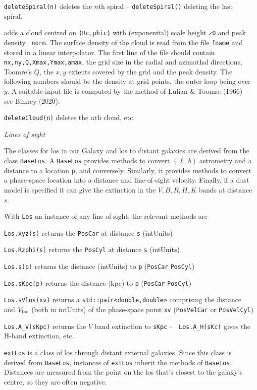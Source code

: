 \nwsec
{\tt deleteSpiral(n)} deletes the $n$th spiral -- {\tt deleteSpiral()}
deleting the last spiral.

 adds a cloud centred on
{\tt(Rc,phic)} with (exponential) scale height {\tt z0} and peak density {\tt
norm}. The surface density of the cloud is read from the file {\tt fname} and
stored in a linear interpolator. The first line of the file should contain
{\tt nx,ny,Q,Xmax,Ymax,amax}, the grid size in the radial and azimuthal
directions, Toomre's $Q$, the $x,y$ extents covered by the grid and the peak
density. The following numbers should be the density at grid points, the
outer loop being over $y$. A suitable input file is computed by the method of
Lulian \& Toomre (1966) -- see Binney (2020). 

\nwsec
{\tt deleteCloud(n)} deletes the $n$th cloud, etc.


\bigskip\centerline{\it Lines of sight}

\nwsec
The classes for los in our Galaxy and los to distant galaxies are derived
from the class {\tt BaseLos}. A {\tt BaseLos} provides methods to convert
$(\ell,b)$ astrometry and a distance to a location {\tt p}, and conversely.
Similarly, it provides methods to convert a phase-space location into a
distance and line-of-sight velocity. Finally, if a dust model is specified it
can give the extinction in the $V,B,R,H,K$ bands at distance $s$.

With {\tt Los} an instance of any line of sight, the relevant methods are


\nwsec
{\tt Los.xyz(s)} returns the {\tt PosCar} at distance {\tt s} (intUnits)

\nwsec
{\tt Los.Rzphi(s)} returns the {\tt PosCyl} at distance {\tt s} (intUnits)

\nwsec
{\tt Los.s(p)} returns the distance (intUnits) to {\tt p} ({\tt PosCar} {\tt PosCyl})

\nwsec
{\tt Los.sKpc(p)} returns the distance (kpc) to {\tt p} ({\tt PosCar} {\tt PosCyl})

\nwsec
{\tt Los.sVlos(xv)} returns a {\tt std::pair<double,double>} comprising the
distance and $V_{\rm los}$ (both in intUnits) of the phase-space point {\tt xv} ({\tt PosVelCar} or
{\tt PosVelCyl}) 

\nwsec
{\tt Los.A\_V(sKpc)} returns the $V$ band extinction to {\tt sKpc} -- {\tt
Los.A\_H(sKc)} gives the H-band extinction, etc.

\nwsec
{\tt extLos} is a class of los through distant external galaxies. Since this
class is derived from {\tt BaseLos}, instances
of {\tt extLos} inherit the methods of {\tt BaseLos}. Distances are measured
from the point on the los that's closest to the galaxy's centre, so they are
often negative.

